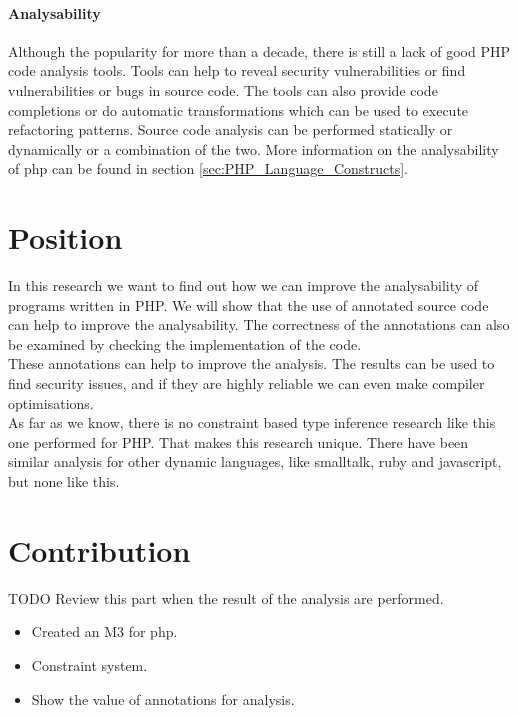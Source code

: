 \documentclass[../main.tex]{subfiles}
\begin{document}
        \paragraph{Analysability}
        Although the popularity for more than a decade, there is still a lack of good PHP code analysis tools.
        Tools can help to reveal security vulnerabilities or find vulnerabilities or bugs in source code.
        The tools can also provide code completions or do automatic transformations which can be used to execute refactoring patterns.
        Source code analysis can be performed statically or dynamically or a combination of the two.
        More information on the analysability of php can be found in section \ref{sec:PHP_Language_Constructs}.
        
    \section{Position} %
        In this research we want to find out how we can improve the analysability of programs written in PHP.
        We will show that the use of annotated source code can help to improve the analysability.
        The correctness of the annotations can also be examined by checking the implementation of the code. 
        \\
        These annotations can help to improve the analysis.
        The results can be used to find security issues, and if they are highly reliable we can even make compiler optimisations.
        \\
        As far as we know, there is no constraint based type inference research like this one performed for PHP.
        That makes this research unique.
        There have been similar analysis for other dynamic languages, like smalltalk, ruby and javascript, but none like this.
       
    \section{Contribution} %
        TODO Review this part when the result of the analysis are performed.
        \begin{itemize}
            \item Created an M3 for php.
            \item Constraint system.
            \item Show the value of annotations for analysis.
        \end{itemize}
\end{document}
